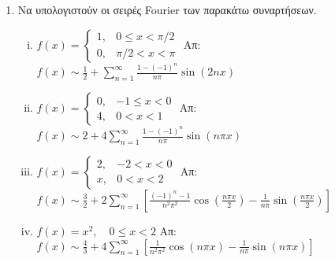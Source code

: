 



\everymath{\displaystyle}


\begin{center}
  \minibox{\large\bfseries  \textcolor{Col1}{Ασκήσεις στις Σειρές Fourier}}
\end{center}

\vspace{\baselineskip}

\begin{enumerate}
  \item Να υπολογιστούν οι σειρές Fourier των παρακάτω συναρτήσεων.
    \begin{enumerate}[i),itemsep=\baselineskip]
      \item $ f(x)=
        \begin{cases} 
          1, & 0 \leq x < \pi /2 \\
          0, & \pi /2 < x < \pi
        \end{cases} $ 
        \hfill Απ: $ f(x) \sim \frac{1}{2} + \sum_{n=1}^{\infty} \frac{1-(-1)^{n}}{n \pi}
        \sin{(2nx)} $ 

      \item $ f(x) = 
         \begin{cases}
           0, & -1 \leq x < 0 \\
           4, & 0 < x < 1
         \end{cases}$
         \hfill Απ: $ f(x) \sim 2 + 4\sum_{n=1}^{\infty} \frac{1-(-1)^{n}}{n \pi} 
         \sin{(n \pi x)} $

      \item $ f(x) = 
        \begin{cases}
          2, & -2<x<0 \\
          x, & 0<x<2
        \end{cases}$
        \hfill Απ: $ f(x) \sim \frac{3}{2} + 2 \sum_{n=1}^{\infty}
        \left[\frac{(-1)^{n}-1}{n^{2} \pi ^{2}} \cos{\left(\frac{n \pi x}{2}\right)}  - 
        \frac{1}{n \pi} \sin{\left(\frac{n \pi x}{2}\right)}\right] $  

       \item $ f(x) = x^{2}, \quad 0 \leq x < 2 $
         \hfill Απ: $ f(x) \sim \frac{4}{3} + 4\sum_{n=1}^{\infty} 
         \left[\frac{1}{n^{2} \pi ^{2}} \cos{(n \pi x)} - \frac{1}{n \pi} 
         \sin{(n \pi x)}\right] $ 
    \end{enumerate}


\end{enumerate}
